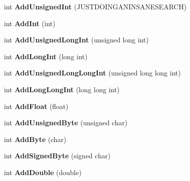 \begin{DoxyCompactItemize}
\item 
\hypertarget{classcl_packet_aa79919447f34e0cb8bde3b17726a6314}{
int {\bfseries AddUnsignedInt} (JUSTDOINGANINSANESEARCH)}
\label{classcl_packet_aa79919447f34e0cb8bde3b17726a6314}

\item 
\hypertarget{classcl_packet_a9832884423d1183944a344c59dfc2552}{
int {\bfseries AddInt} (int)}
\label{classcl_packet_a9832884423d1183944a344c59dfc2552}

\item 
\hypertarget{classcl_packet_aefaadde9e77023b92142bfd7a28ceefa}{
int {\bfseries AddUnsignedLongInt} (unsigned long int)}
\label{classcl_packet_aefaadde9e77023b92142bfd7a28ceefa}

\item 
\hypertarget{classcl_packet_aa9f70adc5bcd174f9701739e41acc670}{
int {\bfseries AddLongInt} (long int)}
\label{classcl_packet_aa9f70adc5bcd174f9701739e41acc670}

\item 
\hypertarget{classcl_packet_ada8fff6ba08f5b4e145dda4601ac305a}{
int {\bfseries AddUnsignedLongLongInt} (unsigned long long int)}
\label{classcl_packet_ada8fff6ba08f5b4e145dda4601ac305a}

\item 
\hypertarget{classcl_packet_a086cd0a316f94e5a79d02439dce3d8aa}{
int {\bfseries AddLongLongInt} (long long int)}
\label{classcl_packet_a086cd0a316f94e5a79d02439dce3d8aa}

\item 
\hypertarget{classcl_packet_a9215183fbd65da82cf552ff51919a76c}{
int {\bfseries AddFloat} (float)}
\label{classcl_packet_a9215183fbd65da82cf552ff51919a76c}

\item 
\hypertarget{classcl_packet_a5e83537f977655d9afc938f5182f0c2f}{
int {\bfseries AddUnsignedByte} (unsigned char)}
\label{classcl_packet_a5e83537f977655d9afc938f5182f0c2f}

\item 
\hypertarget{classcl_packet_a3fbae0293b4199764d22913be3ae0aa3}{
int {\bfseries AddByte} (char)}
\label{classcl_packet_a3fbae0293b4199764d22913be3ae0aa3}

\item 
\hypertarget{classcl_packet_a2a0a304e699ca1d1ab83593b93664949}{
int {\bfseries AddSignedByte} (signed char)}
\label{classcl_packet_a2a0a304e699ca1d1ab83593b93664949}

\item 
\hypertarget{classcl_packet_a1bb1cbacbe2c39de08400e9a5dcfc2e8}{
int {\bfseries AddDouble} (double)}
\label{classcl_packet_a1bb1cbacbe2c39de08400e9a5dcfc2e8}


\end{DoxyCompactItemize}
